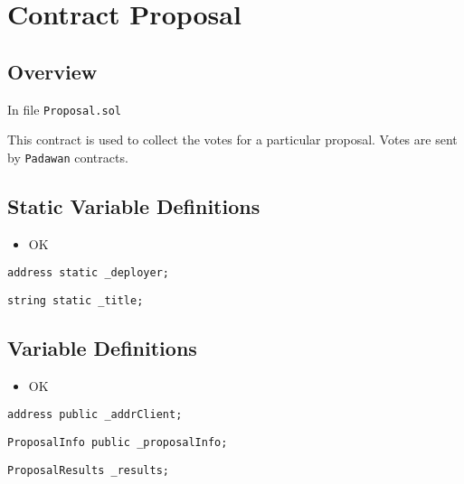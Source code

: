 
\chapter{Contract Proposal}

\minitoc


\section{Overview}

In file {\tt Proposal.sol}

This contract is used to collect the votes for a particular
proposal. Votes are sent by {\tt Padawan} contracts.

\section{Static Variable Definitions}

\begin{itemize}
\item OK
\end{itemize}

\begin{lstlisting}[firstnumber=13]
    address static _deployer;
\end{lstlisting}

\begin{lstlisting}[firstnumber=14]
    string static _title;
\end{lstlisting}

\section{Variable Definitions}

\begin{itemize}
\item OK
\end{itemize}

\begin{lstlisting}[firstnumber=16]
    address public _addrClient;
\end{lstlisting}

\begin{lstlisting}[firstnumber=18]
    ProposalInfo public _proposalInfo;
\end{lstlisting}

\begin{lstlisting}[firstnumber=20]
    ProposalResults _results;
\end{lstlisting}

